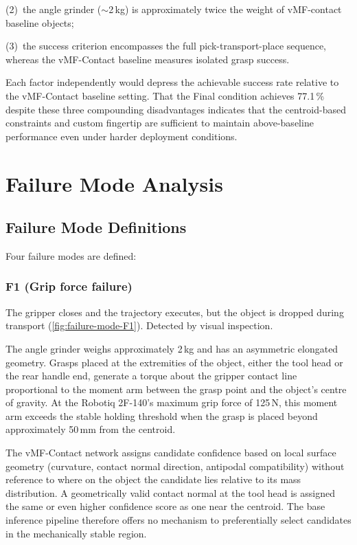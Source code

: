 \documentclass[oneside,studentpaper]{wbk}
\begin{document}
(2)~the angle grinder ($\sim$2\,kg) is approximately twice the weight of vMF-contact baseline objects;

(3)~the success criterion encompasses the full pick-transport-place sequence, whereas the vMF-Contact baseline measures isolated grasp success.

Each factor independently would depress the achievable success rate relative to the vMF-Contact baseline setting. That the Final condition achieves 77.1\,\% despite these three compounding disadvantages indicates that the centroid-based constraints and custom fingertip are sufficient to maintain above-baseline performance even under harder deployment conditions.

\section{Failure Mode Analysis}
\label{sec:failure-mode-analysis}

\subsection{Failure Mode Definitions}
\label{sec:failure-mode-definitions}

Four failure modes are defined:

\subsubsection{F1 (Grip force failure)}
The gripper closes and the trajectory executes, but the object is dropped during transport (\cref{fig:failure-mode-F1}). Detected by visual inspection.

The angle grinder weighs approximately 2\,kg and has an asymmetric elongated geometry. Grasps placed at the extremities of the object, either the tool head or the rear handle end, generate a torque about the gripper contact line proportional to the moment arm between the grasp point and the object's centre of gravity. At the Robotiq 2F-140's maximum grip force of 125\,N, this moment arm exceeds the stable holding threshold when the grasp is placed beyond approximately 50\,mm from the centroid.

The vMF-Contact network assigns candidate confidence based on local surface geometry (curvature, contact normal direction, antipodal compatibility) without reference to where on the object the candidate lies relative to its mass distribution. A geometrically valid contact normal at the tool head is assigned the same or even  higher confidence score as one near the centroid. The base inference pipeline therefore offers no mechanism to preferentially select candidates in the mechanically stable region.
\end{document}
